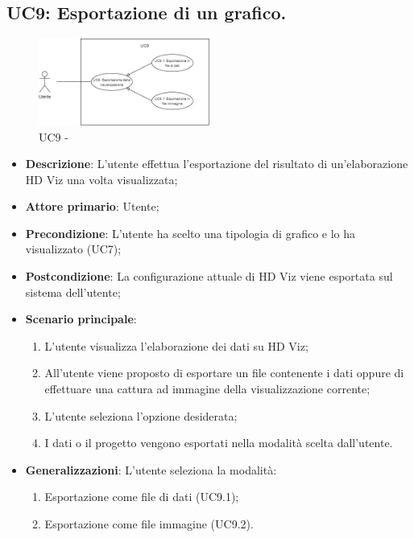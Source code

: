 \subsection{UC9: Esportazione di un grafico.}
\label{sub:uc9}

\begin{figure}[h]
    \centering
    \includegraphics[width=0.5\textwidth]{componenti/casi-duso/diagrammi/UC9.jpg}
    \caption{UC9 - }
    \label{fig:UC9}
\end{figure}


\begin{itemize}
    \item{\textbf{Descrizione}}: L'utente effettua l'esportazione del risultato di un'elaborazione HD Viz una volta visualizzata;
    \item{\textbf{Attore primario}}: Utente;
    \item{\textbf{Precondizione}}: L'utente ha scelto una tipologia di grafico e lo ha visualizzato (UC7);
    \item{\textbf{Postcondizione}}: La configurazione attuale di HD Viz viene esportata sul sistema dell'utente;
    \item{\textbf{Scenario principale}}:
    \begin{enumerate}
        \item   L'utente visualizza l'elaborazione dei dati su HD Viz;
        \item   All'utente viene proposto di esportare un file contenente i dati oppure 
                di effettuare una cattura ad immagine della visualizzazione corrente;
        \item   L'utente seleziona l'opzione desiderata;
        \item   I dati o il progetto vengono esportati nella modalità scelta dall'utente.
    \end{enumerate}
    
    \item{\textbf{Generalizzazioni}}: L'utente seleziona la modalità:
    \begin{enumerate}
        \item   Esportazione come file di dati (UC9.1);
        \item   Esportazione come file immagine (UC9.2).
    \end{enumerate} 
\end{itemize}


